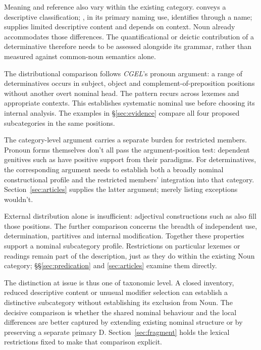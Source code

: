 \documentclass[12pt]{article}
\begin{document}
Meaning and reference also vary within the existing category.  conveys a descriptive classification; , in its primary naming use, identifies through a name;  supplies limited descriptive content and depends on context. Noun already accommodates those differences. The quantificational or deictic contribution of a determinative therefore needs to be assessed alongside its grammar, rather than measured against common-noun semantics alone.

The distributional comparison follows \textit{CGEL}'s pronoun argument: a range of determinatives occurs in subject, object and complement-of-preposition positions without another overt nominal head. The pattern recurs across lexemes and appropriate contexts. This establishes systematic nominal use before choosing its internal analysis. The examples in §\ref{sec:evidence} compare all four proposed subcategories in the same positions.

The category-level argument carries a separate burden for restricted members. Pronoun forms themselves don't all pass the argument-position test: dependent genitives such as  have positive support from their paradigms. For determinatives, the corresponding argument needs to establish both a broadly nominal constructional profile and the restricted members' integration into that category. Section~\ref{sec:articles} supplies the latter argument; merely listing exceptions wouldn't.

External distribution alone is insufficient: adjectival constructions such as  also fill those positions. The further comparison concerns the breadth of independent use, determination, partitives and internal modification. Together these properties support a nominal subcategory profile. Restrictions on particular lexemes or readings remain part of the description, just as they do within the existing Noun category; §§\ref{sec:predication} and \ref{sec:articles} examine them directly.

The distinction at issue is thus one of taxonomic level. A closed inventory, reduced descriptive content or unusual modifier selection can establish a distinctive subcategory without establishing its exclusion from Noun. The decisive comparison is whether the shared nominal behaviour and the local differences are better captured by extending existing nominal structure or by preserving a separate primary D. Section~\ref{sec:fragment} holds the lexical restrictions fixed to make that comparison explicit.
\end{document}
